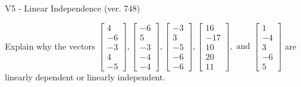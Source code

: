 \begin{exercise}
  \begin{exerciseTitle}V5 - Linear Independence (ver. 748)\end{exerciseTitle}
  \begin{exerciseStatement}
    Explain why the vectors \(\left[\begin{array}{r}
4 \\
-6 \\
-3 \\
4 \\
-5
\end{array}\right] , \left[\begin{array}{r}
-6 \\
5 \\
-3 \\
-4 \\
-4
\end{array}\right] , \left[\begin{array}{r}
-3 \\
3 \\
-5 \\
-6 \\
-6
\end{array}\right] , \left[\begin{array}{r}
16 \\
-17 \\
10 \\
20 \\
11
\end{array}\right] , \text{ and } \left[\begin{array}{r}
1 \\
-4 \\
3 \\
-6 \\
5
\end{array}\right]\) are linearly dependent or linearly independent.	



\end{exerciseStatement}
\end{exercise}
